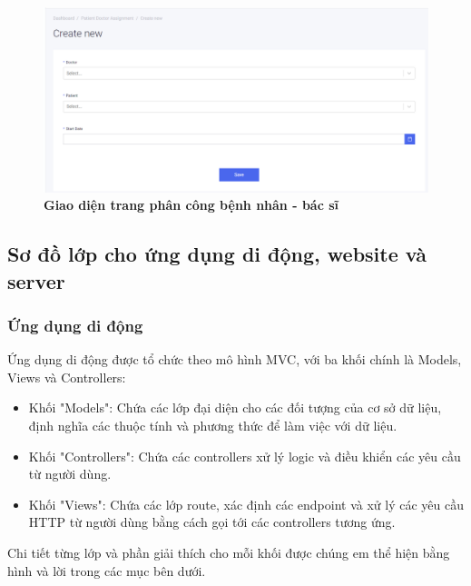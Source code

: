 \begin{figure}[H]
  \centering
  \includegraphics[scale=0.5]{Images/server/webUI/pat_doc_create.PNG}
  \caption[Giao diện trang phân công bệnh nhân - bác sĩ]{\bfseries \fontsize{12pt}{0pt}\selectfont Giao diện trang phân công bệnh nhân - bác sĩ}
  \label{pat_doc_create} %
\end{figure}



\subsection{Sơ đồ lớp cho ứng dụng di động, website và server}

\subsubsection{Ứng dụng di động}


Ứng dụng di động được tổ chức theo mô hình MVC, với ba khối chính là Models, Views và Controllers:
  
\begin{itemize}
  \item Khối "Models": Chứa các lớp đại diện cho các đối tượng của cơ sở dữ liệu, định nghĩa các thuộc tính và phương thức để làm việc với dữ liệu.
 
  \item Khối "Controllers": Chứa các controllers xử lý logic và điều khiển các yêu cầu từ người dùng.

  \item Khối "Views": Chứa các lớp route, xác định các endpoint và xử lý các yêu cầu HTTP từ người dùng bằng cách gọi tới các controllers tương ứng.
\end{itemize}

Chi tiết từng lớp và phần giải thích cho mỗi khối được chúng em thể hiện bằng hình và lời trong các mục bên dưới. 

